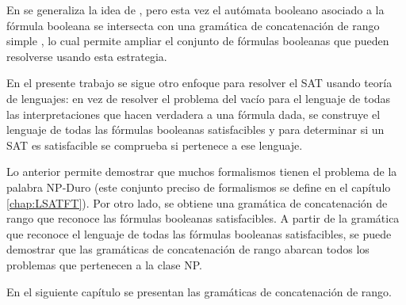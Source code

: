En \cite{aSRCSAT} se generaliza la idea de \cite{aCFSAT}, pero esta vez el autómata booleano asociado a la fórmula booleana se intersecta con una gramática de concatenación de rango simple \cite{mainRCGBib}, lo cual permite ampliar el conjunto de fórmulas booleanas que pueden resolverse usando esta estrategia.

En el presente trabajo se sigue otro enfoque para resolver el SAT usando teoría de lenguajes: en vez de resolver el problema del vacío para el lenguaje de todas las interpretaciones que hacen verdadera a una fórmula dada, se construye el lenguaje de todas las fórmulas booleanas satisfacibles y para determinar si un SAT es satisfacible se comprueba si pertenece a ese lenguaje.

Lo anterior permite demostrar que muchos formalismos tienen el problema de la palabra NP-Duro (este conjunto preciso de formalismos se define en el capítulo \ref{chap:LSATFT}).  Por otro lado, se obtiene una gramática de concatenación de rango que reconoce las fórmulas booleanas satisfacibles. A partir de la gramática que reconoce el lenguaje de todas las fórmulas booleanas satisfacibles, se puede demostrar que las gramáticas de concatenación de rango abarcan todos los problemas que pertenecen a la clase NP.

En el siguiente capítulo se presentan las gramáticas de concatenación de rango.